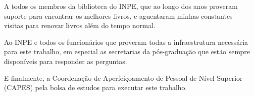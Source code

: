 \begin{agradecimentos}
A todos os membros da biblioteca do INPE, que ao longo dos anos proveram suporte para encontrar os melhores livros, e aguentaram minhas constantes visitas para renovar livros além do tempo normal.

Ao INPE e todos os funcionários que proveram todas a infraestrutura necessária para este trabalho, em especial as secretarias da pós-graduação que estão sempre disponíveis para responder as perguntas.

E finalmente, a Coordenação de Aperfeiçoamento de Pessoal de Nível Superior (CAPES) pela bolsa de estudos para executar este trabalho.

\end{agradecimentos}


